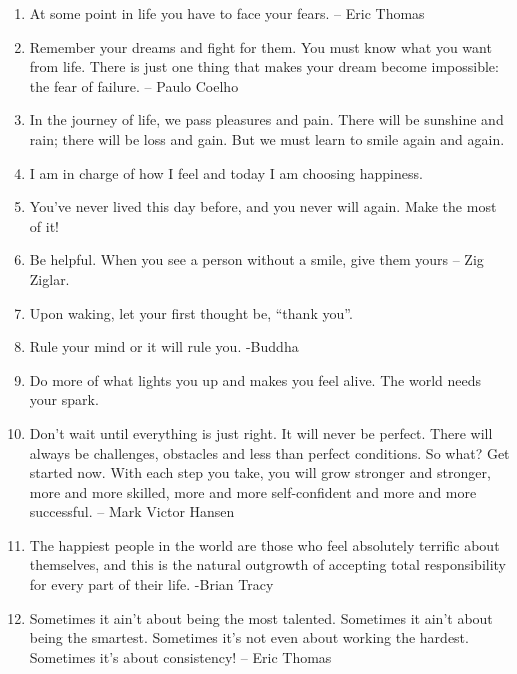 \begin{enumerate}
            \item At some point in life you have to face your fears. – Eric Thomas

            \item Remember your dreams and fight for them. You must know what you want from life. There is just one thing that makes your dream become impossible: the fear of failure. – Paulo Coelho

            \item In the journey of life, we pass pleasures and pain. There will be sunshine and rain; there will be loss and gain. But we must learn to smile again and again.

            \item I am in charge of how I feel and today I am choosing happiness.

            \item You’ve never lived this day before, and you never will again. Make the most of it!

            \item Be helpful. When you see a person without a smile, give them yours – Zig Ziglar.

            \item Upon waking, let your first thought be, “thank you”.

            \item Rule your mind or it will rule you. -Buddha

            \item Do more of what lights you up and makes you feel alive. The world needs your spark.

            \item Don’t wait until everything is just right. It will never be perfect. There will always be challenges, obstacles and less than perfect conditions. So what? Get started now. With each step you take, you will grow stronger and stronger, more and more skilled, more and more self-confident and more and more successful. – Mark Victor Hansen

            \item The happiest people in the world are those who feel absolutely terrific about themselves, and this is the natural outgrowth of accepting total responsibility for every part of their life. -Brian Tracy

            \item Sometimes it ain’t about being the most talented. Sometimes it ain’t about being the smartest. Sometimes it’s not even about working the hardest. Sometimes it’s about consistency! – Eric Thomas


\end{enumerate}

